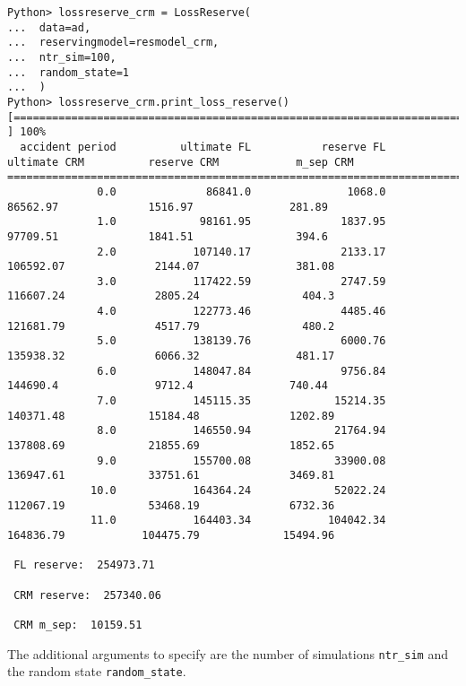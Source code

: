 \documentclass{article}
\begin{document}
\begin{sidewaysfigure}
\small
\begin{lstlisting}
Python> lossreserve_crm = LossReserve(
...  data=ad,
...  reservingmodel=resmodel_crm,
...  ntr_sim=100,
...  random_state=1
...  )
Python> lossreserve_crm.print_loss_reserve()
[============================================================================= ] 100%
  accident period          ultimate FL           reserve FL         ultimate CRM          reserve CRM            m_sep CRM
========================================================================================================================
              0.0              86841.0               1068.0             86562.97              1516.97               281.89
              1.0             98161.95              1837.95             97709.51              1841.51                394.6
              2.0            107140.17              2133.17            106592.07              2144.07               381.08
              3.0            117422.59              2747.59            116607.24              2805.24                404.3
              4.0            122773.46              4485.46            121681.79              4517.79                480.2
              5.0            138139.76              6000.76            135938.32              6066.32               481.17
              6.0            148047.84              9756.84             144690.4               9712.4               740.44
              7.0            145115.35             15214.35            140371.48             15184.48              1202.89
              8.0            146550.94             21764.94            137808.69             21855.69              1852.65
              9.0            155700.08             33900.08            136947.61             33751.61              3469.81
             10.0            164364.24             52022.24            112067.19             53468.19              6732.36
             11.0            164403.34            104042.34            164836.79            104475.79             15494.96

 FL reserve:  254973.71

 CRM reserve:  257340.06

 CRM m_sep:  10159.51
\end{lstlisting}
\end{sidewaysfigure}
\clearpage

The additional arguments to specify are the number of simulations \texttt{ntr\_sim} and the random state \texttt{random\_state}. 
\end{document}

